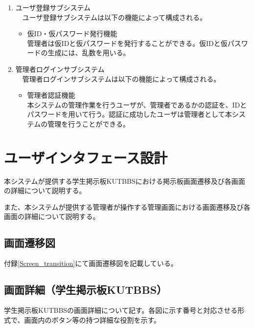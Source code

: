 \documentclass[a4j]{jarticle}
\begin{document}
\begin{enumerate}
  \item ユーザ登録サブシステム\\
  　ユーザ登録サブシステムは以下の機能によって構成される。
  \begin{itemize}
    \item 仮ID・仮パスワード発行機能\\
    管理者は仮IDと仮パスワードを発行することができる。仮IDと仮パスワードの生成には、乱数を用いる。\\
  \end{itemize}


  \item 管理者ログインサブシステム\\
  　管理者ログインサブシステムは以下の機能によって構成される。
  \begin{itemize}
    \item 管理者認証機能\\
    本システムの管理作業を行うユーザが、管理者であるかの認証を、IDとパスワードを用いて行う。認証に成功したユーザは管理者として本システムの管理を行うことができる。
  \end{itemize}

\end{enumerate}



\section{ユーザインタフェース設計}

本システムが提供する学生掲示板KUTBBSにおける掲示板画面遷移及び各画面の詳細について説明する。

また、本システムが提供する管理者が操作する管理画面における画面遷移及び各画面の詳細について説明する。

\subsection{画面遷移図}
付録\ref{Screen_transition}にて画面遷移図を記載している。

\subsection{画面詳細（学生掲示板KUTBBS）}
学生掲示板KUTBBSの画面詳細について記す。各図に示す番号と対応させる形式で、画面内のボタン等の持つ詳細な役割を示す。
\end{document}
